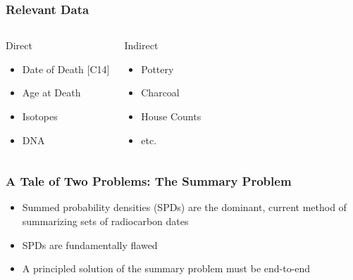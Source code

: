 \documentclass{beamer}
\begin{document}
\begin{frame}[t]
  \frametitle{Relevant Data}
  \begin{columns}[c]
     \begin{block}{Direct}
     \begin{itemize}
       \pause
       \item{Date of Death [C14]} 
       \pause
       \item{Age at Death} 
       \pause
       \item{Isotopes} 
       \pause
       \item{DNA} 
     \end{itemize}
     \end{block}
    \pause

     \begin{block}{Indirect}
     \begin{itemize}
       \pause
       \item{Pottery} 
       \pause
       \item{Charcoal} 
       \pause
       \item{House Counts} 
       \pause
       \item{etc.} 
     \end{itemize}
     \end{block}
  \end{columns}
\end{frame}


\begin{frame}[t]
  \frametitle{A Tale of Two Problems: The Summary Problem}
  \pause
  \begin{itemize}
    \item Summed probability densities (SPDs) are the dominant, current method of summarizing sets of radiocarbon dates
    \pause
    \item SPDs are fundamentally flawed
    \pause
    \item A principled solution of the summary problem must be end-to-end
  \end{itemize}
\end{frame}
\end{document}
